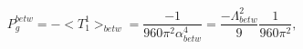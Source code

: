 \begin{equation}
 P^{betw}_{g}=-<T^{1}_{1}>_{betw}=\frac{-1}{960\pi^{2}\alpha_{betw}^{4}}=
 \frac{-\Lambda_{betw}^{2}}{9}\frac{1}{960\pi^{2}},
 \end{equation}

